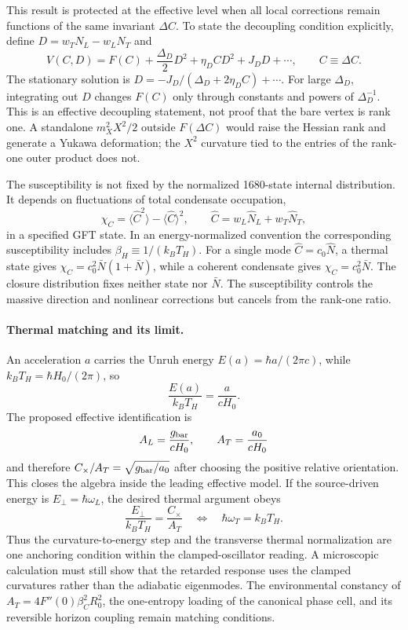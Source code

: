 \documentclass[11pt]{article}
\begin{document}
This result is protected at the effective level when all local corrections remain functions of the same invariant $\Delta C$. To state the decoupling condition explicitly, define $D=w_TN_L-w_LN_T$ and
\[
V(C,D)=F(C)+\frac{\Delta_D}{2}D^2+\eta_DCD^2+J_DD+\cdots,
\qquad C\equiv\Delta C.
\]
The stationary solution is $D=-J_D/(\Delta_D+2\eta_DC)+\cdots$. For large $\Delta_D$, integrating out $D$ changes $F(C)$ only through constants and powers of $\Delta_D^{-1}$. This is an effective decoupling statement, not proof that the bare vertex is rank one. A standalone $m_X^2X^2/2$ outside $F(\Delta C)$ would raise the Hessian rank and generate a Yukawa deformation; the $X^2$ curvature tied to the entries of the rank-one outer product does not.

The susceptibility is not fixed by the normalized 1680-state internal distribution. It depends on fluctuations of total condensate occupation,
\[
\chi_C=\langle \widehat C^2\rangle-\langle\widehat C\rangle^2,
\qquad
\widehat C=w_L\widehat N_L+w_T\widehat N_T,
\]
in a specified GFT state. In an energy-normalized convention the corresponding susceptibility includes $\beta_H\equiv1/(k_BT_H)$. For a single mode $\widehat C=c_0\widehat N$, a thermal state gives $\chi_C=c_0^2\bar N(1+\bar N)$, while a coherent condensate gives $\chi_C=c_0^2\bar N$. The closure distribution fixes neither state nor $\bar N$. The susceptibility controls the massive direction and nonlinear corrections but cancels from the rank-one ratio.

\paragraph{Thermal matching and its limit.}
An acceleration $a$ carries the Unruh energy $E(a)=\hbar a/(2\pi c)$, while $k_BT_H=\hbar H_0/(2\pi)$, so
\[
\frac{E(a)}{k_BT_H}=\frac{a}{cH_0}.
\]
The proposed effective identification is
\[
A_L=\frac{g_{\rm bar}}{cH_0},
\qquad
A_T=\frac{a_0}{cH_0}
\]
and therefore $C_\times/A_T=\sqrt{g_{\rm bar}/a_0}$ after choosing the positive relative orientation. This closes the algebra inside the leading effective model. If the source-driven energy is $E_\perp=\hbar\omega_L$, the desired thermal argument obeys
\[
\frac{E_\perp}{k_BT_H}=\frac{C_\times}{A_T}
\quad\Longleftrightarrow\quad
\hbar\omega_T=k_BT_H.
\]
Thus the curvature-to-energy step and the transverse thermal normalization are one anchoring condition within the clamped-oscillator reading. A microscopic calculation must still show that the retarded response uses the clamped curvatures rather than the adiabatic eigenmodes. The environmental constancy of $A_T=4F''(0)\beta_C^2R_0^2$, the one-entropy loading of the canonical phase cell, and its reversible horizon coupling remain matching conditions.
\end{document}

